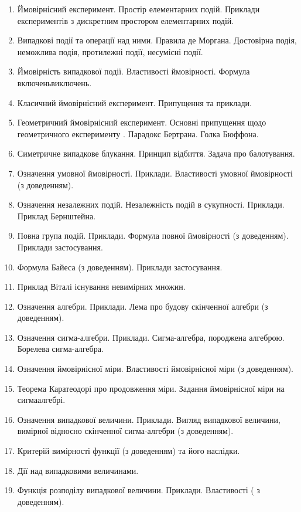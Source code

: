 \begin{enumerate}
    \item Ймовірнісний експеримент. Простір елементарних подій. Приклади
        експериментів з дискретним простором елементарних подій.
    \item Випадкові події та операції над ними. Правила де Моргана. Достовірна подія,
        неможлива подія, протилежні події, несумісні події.
    \item Ймовірність випадкової події. Властивості ймовірності. Формула включеньвиключень.
    \item Класичний ймовірнісний експеримент. Припущення та приклади.
    \item Геометричний ймовірнісний експеримент. Основні припущення щодо
        геометричного експерименту . Парадокс Бертрана. Голка Бюффона.
    \item Симетричне випадкове блукання. Принцип відбиття. Задача про балотування.
    \item Означення умовної ймовірності. Приклади. Властивості умовної ймовірності (з
        доведенням).
    \item Означення незалежних подій. Незалежність подій в сукупності. Приклади.
        Приклад Бернштейна.
    \item Повна група подій. Приклади. Формула повної ймовірності (з доведенням).
        Приклади застосування.
    \item Формула Байеса (з доведенням). Приклади застосування.
    \item Приклад Віталі існування невимірних множин.
    \item Означення алгебри. Приклади. Лема про будову скінченної алгебри (з
        доведенням).
    \item Означення сигма-алгебри. Приклади. Сигма-алгебра, породжена алгеброю.
        Борелева сигма-алгебра.
    \item Означення ймовірнісної міри. Властивості ймовірнісної міри (з доведенням).
    \item Теорема Каратеодорі про продовження міри. Задання ймовірнісної міри на сигмаалгебрі.
    \item Означення випадкової величини. Приклади. Вигляд випадкової величини,
        вимірної відносно скінченної сигма-алгебри (з доведенням).
    \item Критерій вимірності функції (з доведенням) та його наслідки.
    \item Дії над випадковими величинами.
    \item Функція розподілу випадкової величини. Приклади. Властивості ( з доведенням).

\end{enumerate}
